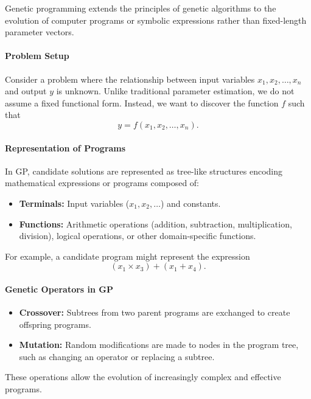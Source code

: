 Genetic programming extends the principles of genetic algorithms to the evolution of computer programs or symbolic expressions rather than fixed-length parameter vectors.

\paragraph{Problem Setup}

Consider a problem where the relationship between input variables $x_1, x_2, \ldots, x_n$ and output $y$ is unknown. Unlike traditional parameter estimation, we do not assume a fixed functional form. Instead, we want to discover the function $f$ such that
\[
y = f(x_1, x_2, \ldots, x_n).
\]

\paragraph{Representation of Programs}

In GP, candidate solutions are represented as tree-like structures encoding mathematical expressions or programs composed of:

\begin{itemize}
    \item \textbf{Terminals:} Input variables ($x_1, x_2, \ldots$) and constants.
    \item \textbf{Functions:} Arithmetic operations (addition, subtraction, multiplication, division), logical operations, or other domain-specific functions.
\end{itemize}

For example, a candidate program might represent the expression
\[
(x_1 \times x_3) + (x_1 + x_4).
\]

\paragraph{Genetic Operators in GP}

\begin{itemize}
    \item \textbf{Crossover:} Subtrees from two parent programs are exchanged to create offspring programs.
    \item \textbf{Mutation:} Random modifications are made to nodes in the program tree, such as changing an operator or replacing a subtree.
\end{itemize}

These operations allow the evolution of increasingly complex and effective programs.

